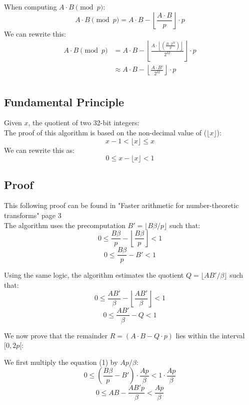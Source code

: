 \documentclass{article}
\begin{document}
When computing $A\cdot B\pmod{p}$:
\begin{equation*}
    A \cdot B \pmod{p} = A \cdot B -  \left\lfloor \frac{A \cdot B}{p} \right\rfloor \cdot p
\end{equation*}
We can rewrite this:
\begin{align*}
    A \cdot B \pmod{p} & = A \cdot B -  \left\lfloor \frac{A \cdot \left\lfloor (\frac{B \cdot 2^{32}}{p}) \right\rfloor}{2^{32}} \right\rfloor \cdot p \\
                       & \approx A \cdot B -  \left\lfloor \frac{A \cdot B'}{2^{32}} \right\rfloor \cdot p                                              \\
\end{align*}


\subsection{Fundamental Principle}
Given $x$, the quotient of two 32-bit integers: \\
The proof of this algorithm is based on the non-decimal value of ($\lfloor x \rfloor$):
$$x - 1 < \lfloor x \rfloor \le x$$
We can rewrite this as:
$$0 \le x - \lfloor x \rfloor < 1$$


\subsection{Proof}
This following proof can be found in "Faster arithmetic for number-theoretic transforms" page 3 \cite{DBLP:journals/corr/abs-1205-2926} \\

The algorithm uses the precomputation $B' = \lfloor B\beta/p \rfloor$ such that:
\[0 \le \frac{B\beta}{p} - \left\lfloor \frac{B\beta}{p} \right\rfloor < 1 \]
\begin{equation}
    0 \le \frac{B\beta}{p} - B' < 1
\end{equation}

Using the same logic, the algorithm estimates the quotient $Q = \lfloor AB'/\beta \rfloor$  such that:
\[0 \le \frac{AB'}{\beta} - \left\lfloor\frac{AB'}{\beta}\right\rfloor < 1\]
\begin{equation}
    0 \le \frac{AB'}{\beta} - Q < 1
\end{equation}

We now prove that the remainder $R = (A \cdot B -Q \cdot p)$ lies within the interval $[0, 2p[$:

We first multiply the equation (1) by $Ap/\beta$:
\[0 \le \left( \frac{B\beta}{p} - B' \right) \cdot \frac{Ap}{\beta} < 1 \cdot \frac{Ap}{\beta}\]
\begin{equation}
    0 \le AB - \frac{AB'p}{\beta} < \frac{Ap}{\beta}
\end{equation}
\end{document}
